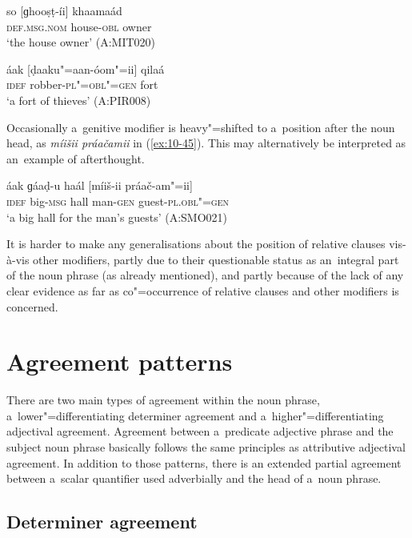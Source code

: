 \begin{exe}
\ex
\label{ex:10-43}
\gll so [ɡhooṣṭ-íi] khaamaád \\
\textsc{def.msg.nom} house-\textsc{obl} owner  \\
\glt `the house owner' (A:MIT020)

\ex
\label{ex:10-44}
\gll áak [ḍaaku"=aan-óom"=ii] qilaá  \\
\textsc{idef} robber-\textsc{pl"=obl"=gen} fort  \\
\glt `a fort of thieves' (A:PIR008)
\end{exe}


Occasionally a~genitive modifier is heavy"=shifted to a~position after the noun head, as \textit{míišii práačamii} in (\ref{ex:10-45}). This may alternatively be interpreted as an~example of afterthought.

\begin{exe}
\ex
\label{ex:10-45}
\gll áak ɡáaḍ-u haál [míiš-ii práač-am"=ii] \\
\textsc{idef} big-\textsc{msg} hall man-\textsc{gen} guest-\textsc{pl.obl"=gen}  \\
\glt `a big hall for the man's guests' (A:SMO021)
\end{exe}


It is harder to make any generalisations about the position of relative clauses vis-à-vis other modifiers, partly due to their questionable status as an~integral part of the noun phrase (as already mentioned), and partly because of the lack of any clear evidence as far as co"=occurrence of relative clauses and other modifiers is concerned.


\section{Agreement patterns}
\label{sec:10-3}

There are two main types of agreement within the noun phrase, a~lower"=differentiating determiner agreement and a~higher"=differentiating adjectival agreement. Agreement between a~predicate adjective phrase and the subject noun phrase basically follows the same principles as attributive adjectival agreement. In addition to those patterns, there is an extended partial agreement between a~scalar quantifier used adverbially and the head of a~noun phrase.


\subsection{Determiner agreement}
\label{subsec:10-3-1}



